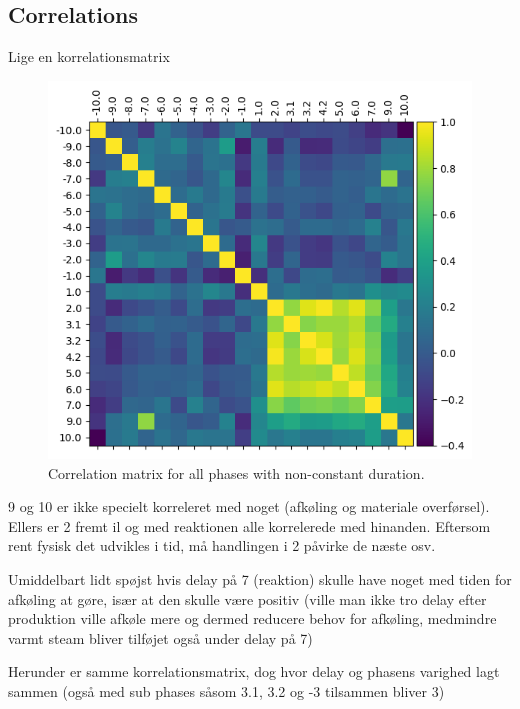\documentclass[../Thesis.tex]{subfiles}
\begin{document}
\subsection{Correlations}

Lige en korrelationsmatrix
\begin{figure}[H]
    \centering
    \includegraphics[width=.9\linewidth]{figures/Multiple cycles data/Correlation matrix production and delays.png}
    \caption{Correlation matrix for all phases with non-constant duration.}
\end{figure}

9 og 10 er ikke specielt korreleret med noget (afkøling og materiale overførsel). Ellers er 2 fremt il og med reaktionen alle korrelerede med hinanden. Eftersom rent fysisk det udvikles i tid, må handlingen i 2 påvirke de næste osv. 

Umiddelbart lidt spøjst hvis delay på 7 (reaktion) skulle have noget med tiden for afkøling at gøre, især at den skulle være positiv (ville man ikke tro delay efter produktion ville afkøle mere og dermed reducere behov for afkøling, medmindre varmt steam bliver tilføjet også under delay på 7)




Herunder er samme korrelationsmatrix, dog hvor delay og phasens varighed lagt sammen (også med sub phases såsom 3.1, 3.2 og -3 tilsammen bliver 3)
\end{document}
